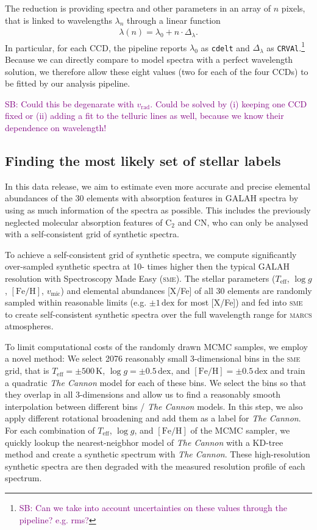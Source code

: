 \documentclass[
  journal=pasa,
  manuscript=research-paper, %
  year=2021,
  volume=37,
]{cup-journal}
\newcommand{\SB}[1]{{\textcolor{purple}{SB: #1}}}
\newcommand{\Teff}{$T_\mathrm{eff}$\xspace}
\newcommand{\logg}{$\log g$\xspace}
\newcommand{\feh}{$\mathrm{[Fe/H]}$\xspace}
\newcommand{\vmic}{$v_\mathrm{mic}$\xspace}
\newcommand{\vrad}{$v_\mathrm{rad}$\xspace}
\newcommand{\TheCannon}{\textit{The Cannon}\xspace}
\newcommand{\sme}{\textsc{sme}\xspace}
\newcommand{\marcs}{\textsc{marcs}\xspace}
\newcommand{\dex}{\,\mathrm{dex}}	%
\newcommand{\K}{\,\mathrm{K}}	%
\begin{document}
The reduction is providing spectra and other parameters in an array of $n$ pixels, that is linked to wavelengths $\lambda_n$ through a linear function
\begin{align}
    \lambda (n) = \lambda_0 + n \cdot \Delta_\lambda.
\end{align}
In particular, for each CCD, the pipeline reports $\lambda_0$ as \texttt{cdelt} and $\Delta_\lambda$ as \texttt{CRVAl}.\footnote{\SB{Can we take into account uncertainties on these values through the pipeline? e.g. rms?}}
Because we can directly compare to model spectra with a perfect wavelength solution, we therefore allow these eight values (two for each of the four CCDs) to be fitted by our analysis pipeline.

\SB{Could this be degenarate with \vrad. Could be solved by (i) keeping one CCD fixed or (ii) adding a fit to the telluric lines as well, because we know their dependence on wavelength!}

\subsection{Finding the most likely set of stellar labels}


In this data release, we aim to estimate even more accurate and precise elemental abundances of the 30 elements with absorption features in GALAH spectra by using as much information of the spectra as possible. This includes the previously neglected molecular absorption features of $\mathrm{C_2}$ and CN, who can only be analysed with a self-consistent grid of synthetic spectra.

To achieve a self-consistent grid of synthetic spectra, we compute significantly over-sampled synthetic spectra at 10- times higher then the typical GALAH resolution with Spectroscopy Made Easy (\sme). The stellar parameters (\Teff, \logg, \feh, \vmic) and elemental abundances [X/Fe] of all 30 elements are randomly sampled within reasonable limits (e.g. $\pm 1 \dex$ for most [X/Fe]) and fed into \sme to create self-consistent synthetic spectra over the full wavelength range for \marcs atmospheres.

To limit computational costs of the randomly drawn MCMC samples, we employ a novel method: We select 2076 reasonably small 3-dimensional bins in the \sme grid, that is \Teff$= \pm 500\K$, \logg$ = \pm 0.5\dex$, and \feh$ = \pm 0.5\dex$ and train a quadratic \TheCannon model for each of these bins. We select the bins so that they overlap in all 3-dimensions and allow us to find a reasonably smooth interpolation between different bins / \TheCannon models. In this step, we also apply different rotational broadening and add them as a label for \TheCannon. For each combination of \Teff, \logg, and \feh of the MCMC sampler, we quickly lookup the nearest-neigbhor model of \TheCannon with a KD-tree method and create a synthetic spectrum with \TheCannon. These high-resolution synthetic spectra are then degraded with the measured resolution profile of each spectrum.
\end{document}
